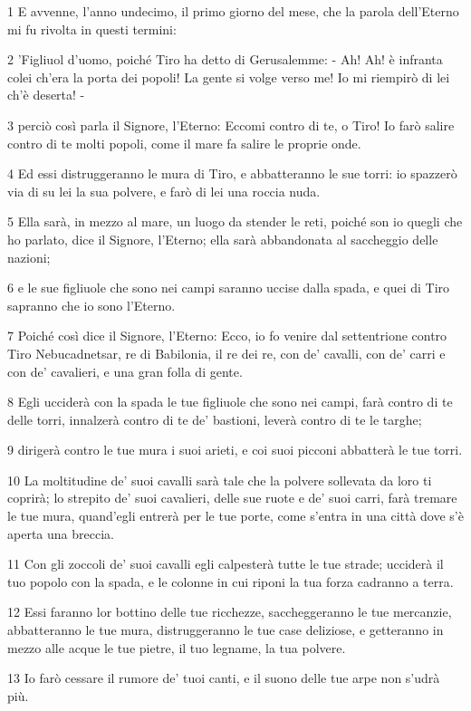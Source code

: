 \par 1 E avvenne, l'anno undecimo, il primo giorno del mese, che la parola dell'Eterno mi fu rivolta in questi termini:
\par 2 'Figliuol d'uomo, poiché Tiro ha detto di Gerusalemme: - Ah! Ah! è infranta colei ch'era la porta dei popoli! La gente si volge verso me! Io mi riempirò di lei ch'è deserta! -
\par 3 perciò così parla il Signore, l'Eterno: Eccomi contro di te, o Tiro! Io farò salire contro di te molti popoli, come il mare fa salire le proprie onde.
\par 4 Ed essi distruggeranno le mura di Tiro, e abbatteranno le sue torri: io spazzerò via di su lei la sua polvere, e farò di lei una roccia nuda.
\par 5 Ella sarà, in mezzo al mare, un luogo da stender le reti, poiché son io quegli che ho parlato, dice il Signore, l'Eterno; ella sarà abbandonata al saccheggio delle nazioni;
\par 6 e le sue figliuole che sono nei campi saranno uccise dalla spada, e quei di Tiro sapranno che io sono l'Eterno.
\par 7 Poiché così dice il Signore, l'Eterno: Ecco, io fo venire dal settentrione contro Tiro Nebucadnetsar, re di Babilonia, il re dei re, con de' cavalli, con de' carri e con de' cavalieri, e una gran folla di gente.
\par 8 Egli ucciderà con la spada le tue figliuole che sono nei campi, farà contro di te delle torri, innalzerà contro di te de' bastioni, leverà contro di te le targhe;
\par 9 dirigerà contro le tue mura i suoi arieti, e coi suoi picconi abbatterà le tue torri.
\par 10 La moltitudine de' suoi cavalli sarà tale che la polvere sollevata da loro ti coprirà; lo strepito de' suoi cavalieri, delle sue ruote e de' suoi carri, farà tremare le tue mura, quand'egli entrerà per le tue porte, come s'entra in una città dove s'è aperta una breccia.
\par 11 Con gli zoccoli de' suoi cavalli egli calpesterà tutte le tue strade; ucciderà il tuo popolo con la spada, e le colonne in cui riponi la tua forza cadranno a terra.
\par 12 Essi faranno lor bottino delle tue ricchezze, saccheggeranno le tue mercanzie, abbatteranno le tue mura, distruggeranno le tue case deliziose, e getteranno in mezzo alle acque le tue pietre, il tuo legname, la tua polvere.
\par 13 Io farò cessare il rumore de' tuoi canti, e il suono delle tue arpe non s'udrà più.
